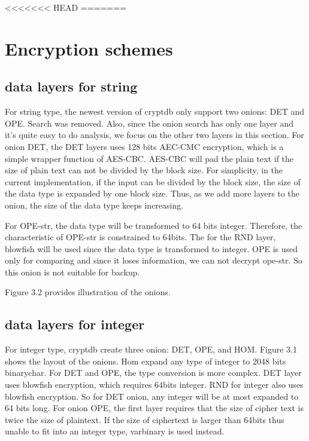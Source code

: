 <<<<<<< HEAD
=======
\section{Encryption schemes}


\subsection{data layers for string}

For string type, the newest version of cryptdb only support two onions: DET and OPE. Search was removed. Also, since the onion search has only one layer and it's quite easy to do analysis, we focus on the other two layers
in this section. For onion DET, the DET layers uses 128 bits AEC-CMC encryption, which is a simple wrapper function of AES-CBC. AES-CBC will pad the plain text if the size of plain text can not be divided by the block size. For simplicity, in the current implementation, if the input can be divided by the block size, the size of the data type is expanded by one block size. Thus, as we add more layers to the onion, the size of the data type keeps increasing. 

For OPE-str, the data type will be transformed to 64 bits integer. Therefore, the characteristic of OPE-str is constrained to 64bits. The for the RND layer, blowfish will be used since the data type is transformed to integer. OPE is used only for comparing and since it loses information, we can not decrypt ope-str. So this onion is not suitable for backup. 

Figure 3.2 provides illustration of the onions. 



\subsection{data layers for integer}

For integer type, cryptdb create three onion: DET, OPE, and HOM. Figure 3.1 shows the layout of the onions. Hom expand any type of integer to 2048 bits binarychar. For DET and OPE, the type conversion is more complex. DET layer uses blowfish encryption, which requires 64bits integer. RND for integer also uses blowfish encryption. So for DET onion, any integer will be at most expanded to 64 bits long. For onion OPE, the first layer requires that the size of cipher text is twice the size of plaintext. If the size of ciphertext is larger than 64bits thus unable to fit into an integer type, varbinary is used instead. 



